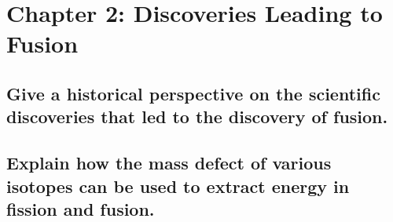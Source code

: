 \section{Chapter 2: Discoveries Leading to Fusion}

\subsection{Give a historical perspective on the scientific discoveries that led to the discovery of fusion.}
\solutionblock{}

\subsection{Explain how the mass defect of various isotopes can be used to extract energy in fission and fusion.}
\solutionblock{}
